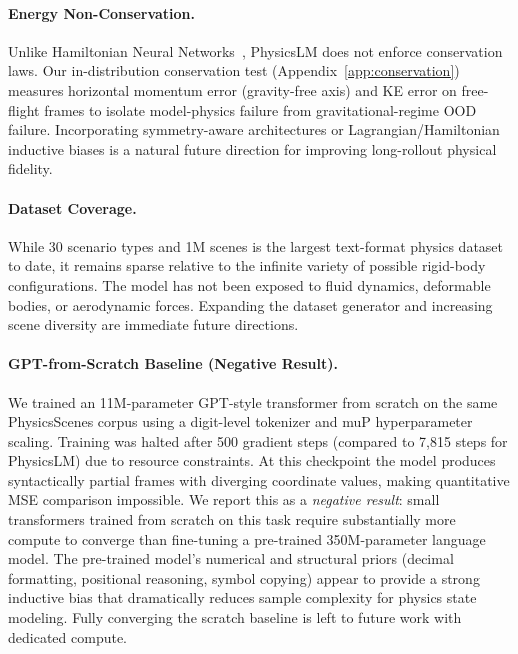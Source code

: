 \documentclass{article}
\begin{document}
\paragraph{Energy Non-Conservation.}
Unlike Hamiltonian Neural Networks~\citep{gregorova2019learned}, PhysicsLM does not
enforce conservation laws. Our in-distribution conservation test (Appendix~\ref{app:conservation})
measures horizontal momentum error (gravity-free axis) and KE error on free-flight frames
to isolate model-physics failure from gravitational-regime OOD failure.
Incorporating symmetry-aware architectures or Lagrangian/Hamiltonian inductive biases
is a natural future direction for improving long-rollout physical fidelity.

\paragraph{Dataset Coverage.}
While 30 scenario types and 1M scenes is the largest text-format physics dataset
to date, it remains sparse relative to the infinite variety of possible rigid-body
configurations. The model has not been exposed to fluid dynamics, deformable
bodies, or aerodynamic forces. Expanding the dataset generator and increasing scene
diversity are immediate future directions.

\paragraph{GPT-from-Scratch Baseline (Negative Result).}
We trained an 11M-parameter GPT-style transformer from scratch on the same
PhysicsScenes corpus using a digit-level tokenizer and muP hyperparameter scaling.
Training was halted after 500 gradient steps (compared to 7,815 steps for
PhysicsLM) due to resource constraints. At this checkpoint the model produces
syntactically partial frames with diverging coordinate values, making quantitative
MSE comparison impossible. We report this as a \emph{negative result}: small
transformers trained from scratch on this task require substantially more compute
to converge than fine-tuning a pre-trained 350M-parameter language model.
The pre-trained model's numerical and structural priors (decimal formatting,
positional reasoning, symbol copying) appear to provide a strong inductive bias
that dramatically reduces sample complexity for physics state modeling.
Fully converging the scratch baseline is left to future work with dedicated compute.
\end{document}

